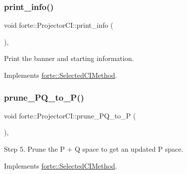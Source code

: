 \subsubsection{\texorpdfstring{print\+\_\+info()}{print\_info()}}
{\footnotesize\ttfamily void forte\+::\+Projector\+C\+I\+::print\+\_\+info (\begin{DoxyParamCaption}{ }\end{DoxyParamCaption})\hspace{0.3cm}{\ttfamily [override]}, {\ttfamily [virtual]}}



Print the banner and starting information. 



Implements \mbox{\hyperlink{classforte_1_1_selected_c_i_method_a95680d60059b29c763b5f87f9add48e2}{forte\+::\+Selected\+C\+I\+Method}}.

\mbox{\label{classforte_1_1_projector_c_i_a2f37b3d1e1751cc6bea1177a70be675c}} 
\subsubsection{\texorpdfstring{prune\+\_\+\+P\+Q\+\_\+to\+\_\+\+P()}{prune\_PQ\_to\_P()}}
{\footnotesize\ttfamily void forte\+::\+Projector\+C\+I\+::prune\+\_\+\+P\+Q\+\_\+to\+\_\+P (\begin{DoxyParamCaption}{ }\end{DoxyParamCaption})\hspace{0.3cm}{\ttfamily [override]}, {\ttfamily [virtual]}}



Step 5. Prune the P + Q space to get an updated P space. 



Implements \mbox{\hyperlink{classforte_1_1_selected_c_i_method_a245f5fcd64ee44acf7b065981380f8dd}{forte\+::\+Selected\+C\+I\+Method}}.

\mbox{\label{classforte_1_1_projector_c_i_af52dd5970339c390a9884b1cdad0a1d7}} 
